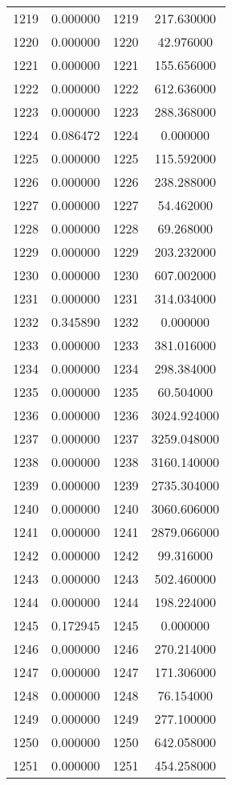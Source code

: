 \documentclass[12pt]{article}
\begin{document}
\begin{longtable}{@{}cccc@{}}
1219 & 0.000000 & 1219 & 217.630000 \\
1220 & 0.000000 & 1220 & 42.976000 \\
1221 & 0.000000 & 1221 & 155.656000 \\
1222 & 0.000000 & 1222 & 612.636000 \\
1223 & 0.000000 & 1223 & 288.368000 \\
1224 & 0.086472 & 1224 & 0.000000 \\
1225 & 0.000000 & 1225 & 115.592000 \\
1226 & 0.000000 & 1226 & 238.288000 \\
1227 & 0.000000 & 1227 & 54.462000 \\
1228 & 0.000000 & 1228 & 69.268000 \\
1229 & 0.000000 & 1229 & 203.232000 \\
1230 & 0.000000 & 1230 & 607.002000 \\
1231 & 0.000000 & 1231 & 314.034000 \\
1232 & 0.345890 & 1232 & 0.000000 \\
1233 & 0.000000 & 1233 & 381.016000 \\
1234 & 0.000000 & 1234 & 298.384000 \\
1235 & 0.000000 & 1235 & 60.504000 \\
1236 & 0.000000 & 1236 & 3024.924000 \\
1237 & 0.000000 & 1237 & 3259.048000 \\
1238 & 0.000000 & 1238 & 3160.140000 \\
1239 & 0.000000 & 1239 & 2735.304000 \\
1240 & 0.000000 & 1240 & 3060.606000 \\
1241 & 0.000000 & 1241 & 2879.066000 \\
1242 & 0.000000 & 1242 & 99.316000 \\
1243 & 0.000000 & 1243 & 502.460000 \\
1244 & 0.000000 & 1244 & 198.224000 \\
1245 & 0.172945 & 1245 & 0.000000 \\
1246 & 0.000000 & 1246 & 270.214000 \\
1247 & 0.000000 & 1247 & 171.306000 \\
1248 & 0.000000 & 1248 & 76.154000 \\
1249 & 0.000000 & 1249 & 277.100000 \\
1250 & 0.000000 & 1250 & 642.058000 \\
1251 & 0.000000 & 1251 & 454.258000 \\

\end{longtable}
\end{document}
